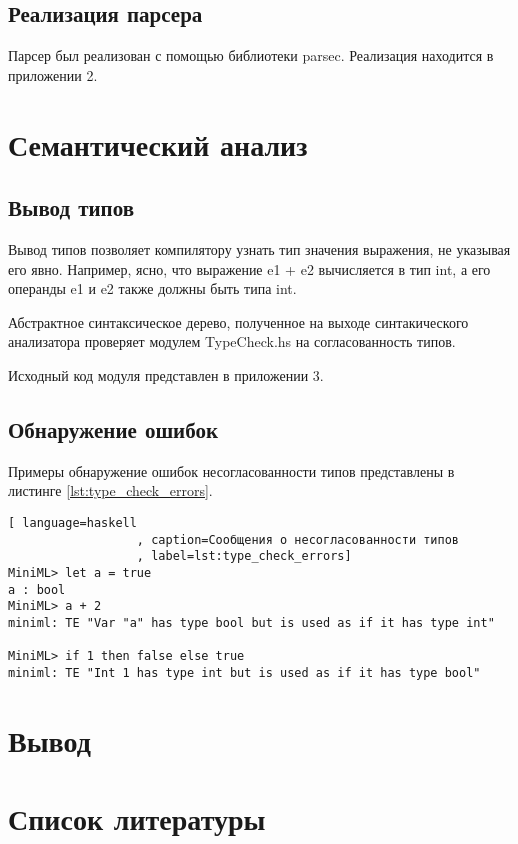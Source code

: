 \documentclass[a4paper,12pt]{article}
\numberwithin{equation}{section}
\begin{document}
\subsection{Реализация парсера}
Парсер был реализован с помощью библиотеки parsec. Реализация находится
в приложении 2.

\section{Семантический анализ}
\subsection{Вывод типов}
Вывод типов позволяет компилятору узнать тип значения выражения, не
указывая его явно. Например, ясно, что выражение e1 + e2 вычисляется
в тип int, а его операнды e1 и e2 также должны быть типа int.


Абстрактное синтаксическое дерево, полученное на выходе синтакического
анализатора проверяет модулем TypeCheck.hs на согласованность типов.


Исходный код модуля представлен в приложении 3.

\subsection{Обнаружение ошибок}
Примеры обнаружение ошибок несогласованности типов представлены
в листинге \ref{lst:type_check_errors}.

\begin{lstlisting}[ language=haskell
                  , caption=Сообщения о несогласованности типов
                  , label=lst:type_check_errors]
MiniML> let a = true
a : bool
MiniML> a + 2
miniml: TE "Var "a" has type bool but is used as if it has type int"

MiniML> if 1 then false else true
miniml: TE "Int 1 has type int but is used as if it has type bool"
\end{lstlisting}

\section{Вывод}


\section{Список литературы}
\printbibliography[heading=none]

\section*{} 
\end{document}
